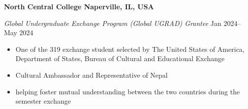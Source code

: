 \textbf{North Central College \hfill Naperville, IL, USA} \par
\textit{Global Undergraduate Exchange Program (Global UGRAD) Grantee} \hfill Jan 2024-- May 2024 \par
\begin{itemize}
	\item One of the 319 exchange student selected by The United States of America, Department of States, Bureau of Cultural and Educational Exchange
	\item Cultural Ambassador and Representative of Nepal
    \item helping foster mutual understanding between the two countries during the semester exchange
\end{itemize}\par